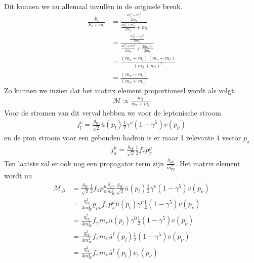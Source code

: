 \documentclass[../main.tex]{subfiles}
\begin{document}
Dit kunnen we nu allemaal invullen in de originele breuk.
\begin{equation}
    \begin{aligned}
        \label{eq:omvormen_breuk_pion_verval}
        \frac{p_l}{E_l+m_l} &= \frac{\frac{m_\pi^2-m_l^2}{2m_\pi}}{\frac{m_\pi^2 + m_l^2}{2m_\pi}+m_l}\\
                            &= \frac{\frac{m_\pi^2-m_l^2}{2m_\pi}}{\frac{m_\pi^2 + m_l^2}{2m_\pi}+\frac{2m_\pi m_l}{2m_\pi}}\\
                            &= \frac{(m_\pi+m_l)(m_\pi-m_l)}{(m_\pi+m_l)^2}\\
                            &= \frac{(m_\pi-m_l)}{(m_\pi+m_l)}
    \end{aligned}
\end{equation}
Zo kunnen we inzien dat het matrix element proportioneel wordt als volgt:
\begin{equation}
    \begin{aligned}
        \label{eq:pion_verval_matrix_2}
        \mathcal{M} \propto \frac{m_l}{m_\pi + m_l} 
    \end{aligned}
\end{equation}
Voor de stromen van dit verval hebben we voor de leptonische stroom
\begin{equation}
    \begin{aligned}
        \label{eq:pion_verval_lept_stroom}
        j_l^\nu = \frac{g_W}{\sqrt{2}} \overline u(p_l) \frac{1}{2} \gamma^\nu (1-\gamma^5)v(p_{\overline \nu})
    \end{aligned}
\end{equation}
en de pion stroom voor een gebonden hadron is er maar 1 relevante 4 vector $p_\pi$
\begin{equation}
    \begin{aligned}
        \label{eq:pion_verval_pion_stroom}
        j_\pi^\mu = \frac{g_W}{\sqrt{2}} \frac{1}{2} f_\pi p_\pi^\mu
    \end{aligned}
\end{equation}
Ten laatste zal er ook nog een propagator term zijn $ \frac{g_{\mu\nu}}{m_W^2} $. Het matrix element wordt nu
\begin{equation}
    \begin{aligned}
        \label{eq:pion_verval_matrix_3}
        \mathcal{M}_{fi} &= \frac{g_W}{\sqrt{2}} \frac{1}{2} f_\pi p_\pi^\mu \frac{g_{\mu\nu}}{m_W^2} \frac{g_W}{\sqrt{2}} \overline u(p_l) \frac{1}{2} \gamma^\nu (1-\gamma^5)v(p_{\overline \nu})\\
                         &= \frac{g_W^2}{4m_W^2} g_{\mu\nu} f_\pi p_\pi^\mu \overline u(p_l) \gamma^\nu \frac{1}{2} (1-\gamma^5)v(p_{\overline \nu})\\
                         &= \frac{g_W^2}{4m_W^2} f_\pi m_\pi \overline u(p_l) \gamma^0 \frac{1}{2} (1-\gamma^5)v(p_{\overline \nu})\\
                         &= \frac{g_W^2}{4m_W^2} f_\pi m_\pi \overline u^\dagger(p_l) \frac{1}{2} (1-\gamma^5)v(p_{\overline \nu})\\
                         &= \frac{g_W^2}{4m_W^2} f_\pi m_\pi \overline u^\dagger(p_l)v_\uparrow(p_{\overline \nu})
    \end{aligned}
\end{equation}
\end{document}
